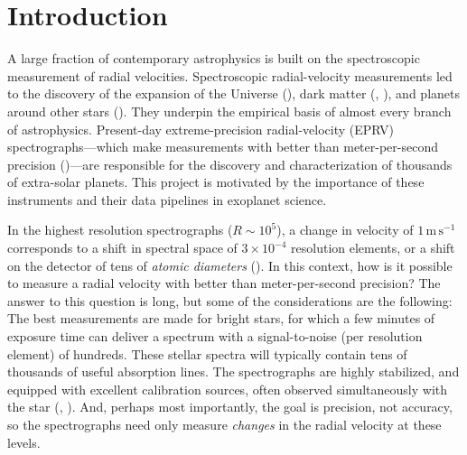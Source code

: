 \documentclass[modern]{aastex631}
\newcommand{\unit}[1]{\mathrm{#1}}
\newcommand{\m}{\unit{m}}
\newcommand{\s}{\unit{s}}
\newcommand{\mps}{\m\,\s^{-1}}
\newcommand{\acronym}[1]{\textsc{#1}}
\newcommand{\EPRV}{\acronym{EPRV}}
\begin{document}

\section{Introduction}\label{sec:intro}

A large fraction of contemporary astrophysics is built on the spectroscopic measurement of radial velocities.
Spectroscopic radial-velocity measurements led to the discovery of the expansion of the Universe (\citealt{hubble}),
dark matter (\citealt{zwicky}, \citealt{rubin}),
and planets around other stars (\citealt{mayor}).
They underpin the empirical basis of almost every branch of astrophysics.
Present-day extreme-precision radial-velocity (\EPRV) spectrographs---which make measurements with better than meter-per-second precision (\citealt{what?})---are responsible for the discovery and characterization of thousands of extra-solar planets.
This project is motivated by the importance of these instruments and their data pipelines in exoplanet science.

In the highest resolution spectrographs ($R\sim 10^5$), a change in velocity of $1\,\mps$ corresponds to a shift in spectral space of $3\times 10^{-4}$ resolution elements, or a shift on the detector of tens of \emph{atomic diameters} (\citealt{zhaophd}).
In this context, how is it possible to measure a radial velocity with better than meter-per-second precision?
The answer to this question is long, but some of the considerations are the following:
The best measurements are made for bright stars, for which a few minutes of exposure time can deliver a spectrum with a signal-to-noise (per resolution element) of hundreds.
These stellar spectra will typically contain tens of thousands of useful absorption lines.
The spectrographs are highly stabilized, and equipped with excellent calibration sources, often observed simultaneously with the star (\citep{simultaneousreference}, \citep{gascell}).
And, perhaps most importantly, the goal is precision, not accuracy, so the spectrographs need only measure \emph{changes} in the radial velocity at these levels.
\end{document}
